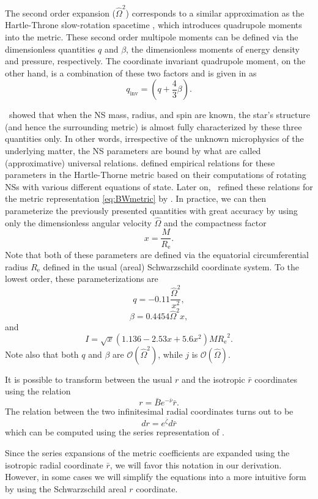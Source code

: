\documentclass{aa}
\newcommand{\be}{\begin{equation}}
\newcommand{\ee}{\end{equation}}
\newcommand{\Req}{\ensuremath{R_{\mathrm{e}}}}
\newcommand{\sch}{Schwarzschild }
\newcommand{\rb}{\ensuremath{\bar{r}}}
\newcommand{\Ob}{\ensuremath{\hat{\Omega}}}
\newcommand{\nub}{\ensuremath{\bar{\nu}}}
\newcommand{\zetab}{\ensuremath{\bar{\zeta}}}
\newcommand{\Bb}{\ensuremath{\bar{B}}}
\newcommand{\qinv}{\ensuremath{q_{\mathrm{inv}}}}
\begin{document}
The second order expansion ($\Ob^2$) corresponds to a similar approximation as the Hartle-Throne slow-rotation spacetime \citep{HT68}, which introduces quadrupole moments into the metric.  
These second order multipole moments can be defined via the dimensionless quantities $q$ and $\beta$, the dimensionless moments of energy density and pressure, respectively.
The coordinate invariant quadrupole moment, on the other hand, is a combination of these two factors and is given in \citet{PA12} as
\be
\qinv = \left( q + \frac{4}{3} \beta \right).
\ee

\citet{YY13} showed that when the NS mass, radius, and spin are known, the star's structure (and hence the surrounding metric) is almost fully characterized by these three quantities only.
In other words, irrespective of the unknown microphysics of the underlying matter, the NS parameters are bound by what are called (approximative) universal relations.
\citet{BBP13} defined empirical relations for these parameters in the Hartle-Thorne metric based on their computations of rotating NSs with various different equations of state.
Later on, \citet{aGM14} refined these relations for the metric representation \eqref{eq:BWmetric} by \citet{BI76}.
In practice, we can then parameterize the previously presented quantities with great accuracy by using only the dimensionless angular velocity $\Ob$ and the compactness factor
\be
x = \frac{M}{\Req}.
\ee
Note that both of these parameters are defined via the equatorial circumferential radius $\Req$ defined in the usual (areal) \sch coordinate system.
To the lowest order, these parameterizations are
\be\label{eq:quad}
q = -0.11 \frac{\Ob^2}{x^2},
\ee
\be\label{eq:beta}
\beta = 0.4454 \Ob^2 x,
\ee
and
\be
I = \sqrt{x} (1.136 - 2.53 x + 5.6 x^2) M \Req^2.
\ee
Note also that both $q$ and $\beta$ are $\mathcal{O}(\Ob^2)$, while $j$ is $\mathcal{O}(\Ob)$.
    
It is possible to transform between the usual $r$ and the isotropic $\rb$ coordinates using the relation \citep{FIP86}
\be\label{eq:rb2r}
r = \Bb e^{-\nub} \rb.
\ee
The relation between the two infinitesimal radial coordinates turns out to be
\be\label{eq:drb2dr}
dr = e^{\zetab} d\rb
\ee
which can be computed using the series representation of \cite{BI76}.

Since the series expansions of the metric coefficients are expanded using the isotropic radial coordinate $\rb$, we will favor this notation in our derivation.  
However, in some cases we will simplify the equations into a more intuitive form by using the \sch areal $r$ coordinate.
\end{document}
